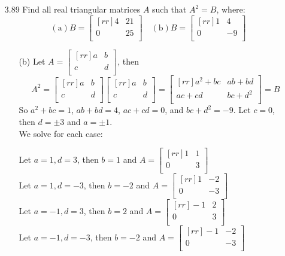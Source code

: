 \documentclass[12pt]{article}
\theoremstyle{plain}
\theoremstyle{definition}
\theoremstyle{plain}
\begin{document}
\begin{enumerate}
\item[3.89]Find all real triangular matrices $A$ such that $A^2=B$, where:
\[ \mathrm{(a)} B=\begin{bmatrix}[rr]4&21\\0&25\\\end{bmatrix} \quad \mathrm{(b)} B = \begin{bmatrix}[rr]1&4\\0&-9\\\end{bmatrix} \]
	\begin{enumerate}
	\item[(b)] Let $A=\begin{bmatrix}[rr]a&b\\c&d\\\end{bmatrix}$, then
		\[ A^2 = \begin{bmatrix}[rr]a&b\\c&d\\\end{bmatrix}\begin{bmatrix}[rr]a&b\\c&d\\\end{bmatrix} = \begin{bmatrix}[rr]a^2+bc&ab+bd\\ac+cd&bc+d^2\\\end{bmatrix} = B \]
		So $a^2+bc = 1$, $ab+bd = 4$, $ac+cd = 0$, and $bc+d^2 = -9$. Let $c=0$, then $d=\pm 3$ and $a=\pm 1$.\\
		We solve for each case:
		\begin{center}
		Let $a=1,d=3$, then $b=1$ and $A=\begin{bmatrix}[rr]1&1\\0&3\\\end{bmatrix}$\\
		Let $a=1,d=-3$, then $b=-2$ and $A=\begin{bmatrix}[rr]1&-2\\0&-3\\\end{bmatrix}$\\
		Let $a=-1,d=3$, then $b=2$ and $A=\begin{bmatrix}[rr]-1&2\\0&3\\\end{bmatrix}$\\
		Let $a=-1,d=-3$, then $b=-2$ and $A=\begin{bmatrix}[rr]-1&-2\\0&-3\\\end{bmatrix}$
		\end{center}
	\end{enumerate}	
		

\end{enumerate}
\end{document}
